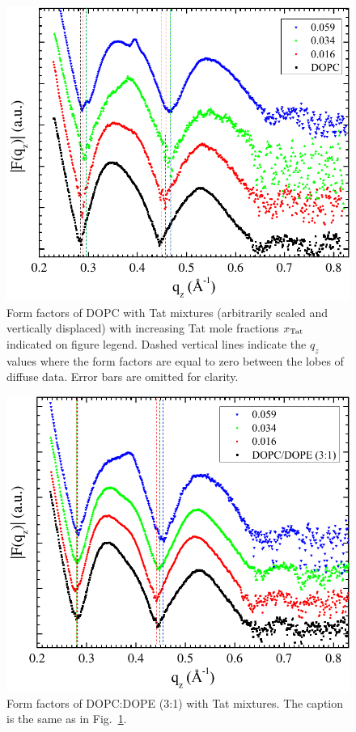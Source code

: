 \begin{figure}[htbp]
  \centering
  \includegraphics[width=\textwidth]{figures/Tat/NFIT_results/DOPC_form_factors}
  \caption{Form factors of DOPC with Tat mixtures (arbitrarily scaled and vertically 
  displaced) with increasing Tat mole fractions $x_\textrm{Tat}$ indicated on figure 
  legend. 
  Dashed vertical lines indicate the $q_z$ values where the form factors are equal 
  to zero between the lobes of diffuse data.
  Error bars are omitted for clarity.}
  \label{fig:form_factor1}
\end{figure}

\begin{figure}[htbp]
  \centering
  \includegraphics[width=\textwidth]{figures/Tat/NFIT_results/DOPCDOPE3to1_form_factors}
  \caption{Form factors of DOPC:DOPE (3:1) with Tat mixtures.
  The caption is the same as in Fig.~\ref{fig:form_factor1}.}
  \label{fig:form_factor2}
\end{figure}

